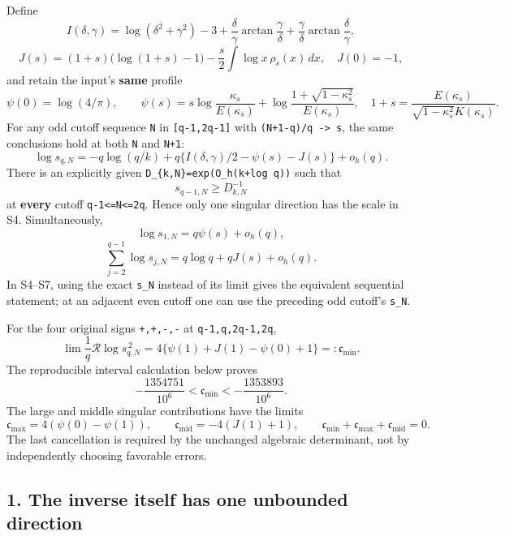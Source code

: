 Define \[
 I(\delta,\gamma)=\log(\delta^2+\gamma^2)-3
 +\frac\delta\gamma\arctan\frac\gamma\delta
 +\frac\gamma\delta\arctan\frac\delta\gamma,                         \tag{S1}
\] \[
 J(s)=(1+s)\bigl(\log(1+s)-1\bigr)
       -\frac s2\int\log x\,\rho_s(x)\,dx,\quad J(0)=-1,             \tag{S2}
\] and retain the input's \textbf{same} profile \[
 \psi(0)=\log(4/\pi),\qquad
 \psi(s)=s\log\frac{\kappa_s}{E(\kappa_s)}
          +\log\frac{1+\sqrt{1-\kappa_s^2}}{E(\kappa_s)},
 \quad 1+s=\frac{E(\kappa_s)}{\sqrt{1-\kappa_s^2}K(\kappa_s)}.       \tag{S3}
\] For any odd cutoff sequence \texttt{N} in \texttt{{[}q-1,2q-1{]}} with \texttt{(N+1-q)/q\ -\textgreater{}\ s}, the same conclusions hold at both \texttt{N} and \texttt{N+1}: \[
 \boxed{\log s_{q,N}
 =-q\log(q/k)+q\{I(\delta,\gamma)/2-\psi(s)-J(s)\}+o_h(q).}         \tag{S4}
\] There is an explicitly given \nolinkurl{D_{k,N}=exp(O_h(k+log q))} such that \[
 \boxed{s_{q-1,N}\ge D_{k,N}^{-1}}                                  \tag{S5}
\] at \textbf{every} cutoff \texttt{q-1\textless{}=N\textless{}=2q}. Hence only one singular direction has the scale in S4. Simultaneously, \[
 \log s_{1,N}=q\psi(s)+o_h(q),                                      \tag{S6}
\] \[
 \boxed{\sum_{j=2}^{q-1}\log s_{j,N}
             =q\log q+qJ(s)+o_h(q).}                               \tag{S7}
\] In S4--S7, using the exact \texttt{s\_N} instead of its limit gives the equivalent sequential statement; at an adjacent even cutoff one can use the preceding odd cutoff's \texttt{s\_N}.

For the four original signs \texttt{+,+,-,-} at \texttt{q-1,q,2q-1,2q}, \[
 \boxed{\lim\frac1q\mathcal R\log s_{q,N}^{\,2}
 =4\{\psi(1)+J(1)-\psi(0)+1\}=:\mathfrak c_{\min}.}                 \tag{S8}
\] The reproducible interval calculation below proves \[
 -\frac{1354751}{10^6}<\mathfrak c_{\min}
 < -\frac{1353893}{10^6}.                                          \tag{S9}
\] The large and middle singular contributions have the limits \[
 \mathfrak c_{\max}=4(\psi(0)-\psi(1)),\qquad
 \mathfrak c_{\mathrm{mid}}=-4(J(1)+1),\qquad
 \mathfrak c_{\min}+\mathfrak c_{\max}+\mathfrak c_{\mathrm{mid}}=0.   \tag{S10}
\] The last cancellation is required by the unchanged algebraic determinant, not by independently choosing favorable errors.

\subsection{1. The inverse itself has one unbounded direction}\label{the-inverse-itself-has-one-unbounded-direction}

